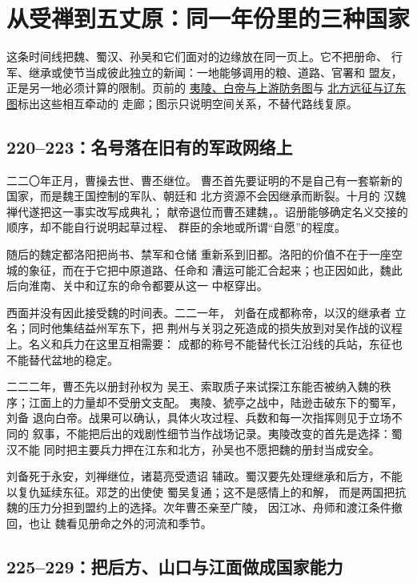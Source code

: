 \section{从受禅到五丈原：同一年份里的三种国家}

这条时间线把魏、蜀汉、孙吴和它们面对的边缘放在同一页上。它不把册命、
行军、继承或使节当成彼此独立的新闻：一地能够调用的粮、道路、官署和
盟友，正是另一地必须计算的限制。页前的
\hyperref[fig:vol02b:yiling-river-defense]{夷陵、白帝与上游防务图}与
\hyperref[fig:vol02b:northern-liaodong]{北方远征与辽东图}标出这些相互牵动的
走廊；图示只说明空间关系，不替代路线复原。

\subsection{220--223：名号落在旧有的军政网络上}

二二〇年正月，曹操去世、曹丕继位。
曹丕首先要证明的不是自己有一套崭新的国家，而是魏王国控制的军队、朝廷和
北方资源不会因继承而断裂。十月的
汉魏禅代遂把这一事实改写成典礼；
献帝退位而曹丕建魏，。诏册能够确定名义交接的顺序，却不能自行说明起草过程、
群臣的余地或所谓“自愿”的程度。

随后的魏定都洛阳把尚书、禁军和仓储
重新系到旧都。洛阳的价值不在于一座空城的象征，而在于它把中原道路、任命和
漕运可能汇合起来；也正因如此，魏此后向淮南、关中和辽东的命令都要从这一
中枢穿出。

西面并没有因此接受魏的时间表。二二一年，
刘备在成都称帝，以汉的继承者
立名；同时他集结益州军东下，把
荆州与关羽之死造成的损失放到对吴作战的议程上。名义和兵力在这里互相需要：
成都的称号不能替代长江沿线的兵站，东征也不能替代盆地的稳定。

二二二年，曹丕先以册封孙权为
吴王、索取质子来试探江东能否被纳入魏的秩序；江面上的力量却不受册文支配。
夷陵、猇亭之战中，陆逊击破东下的蜀军，刘备
退向白帝。战果可以确认，具体火攻过程、兵数和每一次指挥则见于立场不同的
叙事，不能把后出的戏剧性细节当作战场记录。夷陵改变的首先是选择：蜀汉不能
同时把主要兵力押在江东和北方，孙吴也不愿把魏的册封当成安全。

刘备死于永安，刘禅继位，诸葛亮受遗诏
辅政。蜀汉要先处理继承和后方，不能以复仇延续东征。邓芝的出使使
蜀吴复通；这不是感情上的和解，
而是两国把抗魏的压力分担到盟约上的选择。次年曹丕亲至广陵，
因江冰、舟师和渡江条件撤回，也让
魏看见册命之外的河流和季节。

\subsection{225--229：把后方、山口与江面做成国家能力}

